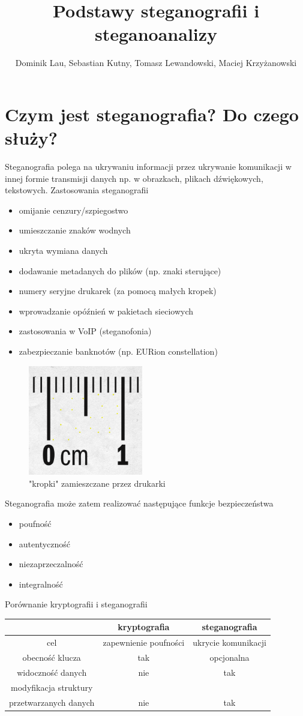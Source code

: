 \documentclass{article}
\title{Podstawy steganografii i steganoanalizy}
\author{Dominik Lau, Sebastian Kutny, Tomasz Lewandowski, Maciej Krzyżanowski}
\begin{document}
\maketitle

\tableofcontents

\section{Czym jest steganografia? Do czego służy?}
Steganografia polega na ukrywaniu informacji przez ukrywanie komunikacji w innej formie transmisji danych
np. w obrazkach,  plikach dźwiękowych, tekstowych.  Zastosowania steganografii
\begin{itemize}
	\item omijanie cenzury/szpiegostwo
	\item umieszczanie znaków wodnych
	\item ukryta wymiana danych
	\item dodawanie metadanych do plików (np. znaki sterujące)
	\item numery seryjne drukarek (za pomocą małych kropek)
	\item wprowadzanie opóźnień w pakietach sieciowych
	\item zastosowania w VoIP (steganofonia)
	\item zabezpieczanie banknotów (np. EURion constellation)
\end{itemize}
\begin{figure}
	\centering
	\includegraphics[width=5cm]{stego_drukarkowa}
	\caption{"kropki" zamieszczane przez drukarki}
\end{figure}
Steganografia może zatem realizować następujące funkcje bezpieczeństwa
\begin{itemize}
	\item poufność
	\item autentyczność
	\item niezaprzeczalność
	\item integralność
\end{itemize}
Porównanie kryptografii i steganografii
\begin{center}
\begin{tabular}{c | c  c }
& kryptografia & steganografia \\
\hline
cel & zapewnienie poufności & ukrycie komunikacji \\
obecność klucza & tak & opcjonalna \\
widoczność danych & nie & tak \\
modyfikacja struktury  \\
 przetwarzanych danych & nie & tak
\end{tabular}
\end{center}
\end{document}
